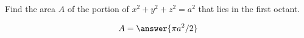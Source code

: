 \documentclass{ximera}
\author{David Guichard \and Neal Koblitz \and H. Jerome Keisler \and Albert Scheller \and Barry Balof \and Mike Wills \and Matthew Carr}
\begin{document}
\begin{exercise}




Find the area $A$ of the portion of $x^2+y^2+z^2=a^2$ that lies in the first octant.
 
\begin{prompt}
\[
A=\answer{\pi a^2/2}
\]
\end{prompt}


\end{exercise}
\end{document}
